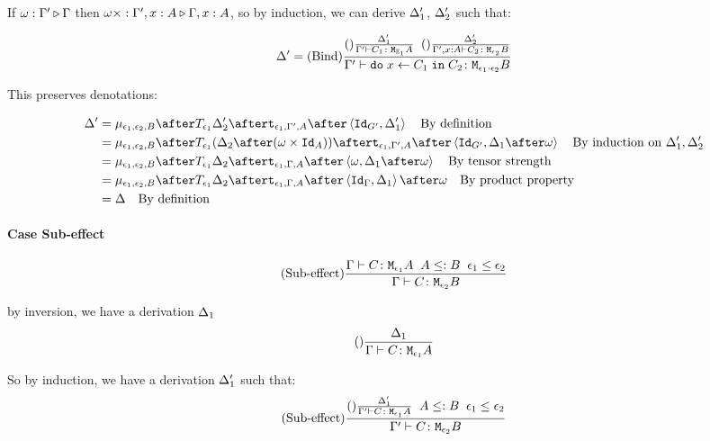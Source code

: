 {    If $\omega : \Gamma' \triangleright \Gamma$ then $\omega\times : \Gamma',x:A \triangleright \Gamma, x: A$, so by induction, we can derive $\Delta_1'$, $\Delta_2'$ such that:

    \begin{equation}
        \Delta' = (\text{Bind}) \frac{
            (\text{}) \frac{\Delta_1'}{\Gamma' \vdash C_1 \colon \texttt{M}_{\mathbb{E}_1}{A}}
            \;\;
            (\text{}) \frac{\Delta_2'}{\Gamma',x: A \vdash C_2 \colon \texttt{M}_{\epsilon_2}{B}}
        }{
            \Gamma' \vdash \texttt{do}\; x \leftarrow C_1 \;\texttt{in}\; C_2 \colon \texttt{M}_{\epsilon_1\cdot\epsilon_2}{B}
        }
    \end{equation}

    This preserves denotations:

    \begin{align}
        \D' & = \bind{\e_1}{\e_2}{B}\after\T{\e_1}{\D_2'}\after\tstrength{\e_1}{\G'}{A}\after\pr{\Id{G'}}{\D_1'}\qt{By definition}\\
        & = \bind{\e_1}{\e_2}{B}\after\T{\e_1}{(\D_2\after(\w\times\Id{A}))}\after\tstrength{\e_1}{\G'}{A}\after\pr{\Id{G'}}{\D_1\after\w}\qt{By induction on $\D_1', \D_2'$}\\
        & = \bind{\e_1}{\e_2}{B}\after\T{\e_1}{\D_2}\after\tstrength{\e_1}{\G}{A}\after\pr{\w}{\D_1\after\w}\qt{By tensor strength}\\
        & = \bind{\e_1}{\e_2}{B}\after\T{\e_1}{\D_2}\after\tstrength{\e_1}{\G}{A}\after\pr{\idg}{\D_1}\after\w\qt{By product property}\\
        & = \D \qt{By definition}
    \end{align}





    \paragraph{Case Sub-effect}


    \begin{equation}
        (\text{Sub-effect}) \frac{\Gamma \vdash C \colon \texttt{M}_{\epsilon_1}{A}\;\; A\leq: B\;\; \epsilon_1\leq\epsilon_2}{\Gamma \vdash C \colon \texttt{M}_{\epsilon_2}{B}}
    \end{equation}

    by inversion, we have a derivation $\Delta_1$
    \begin{equation}
        (\text{}) \frac{\Delta_1}{\Gamma \vdash C \colon \texttt{M}_{\epsilon_1}{A}}
    \end{equation}

    So by induction, we have a derivation $\Delta_1'$ such that:
    \begin{equation}
        (\text{Sub-effect}) \frac{(\text{}) \frac{\Delta_1'}{\Gamma' \vdash C \colon \texttt{M}_{\epsilon_1}{A}}\;\; A \leq: B\;\; \epsilon_1\leq\epsilon_2}{\Gamma' \vdash C \colon \texttt{M}_{\epsilon_2}{B}}
    \end{equation}

}
